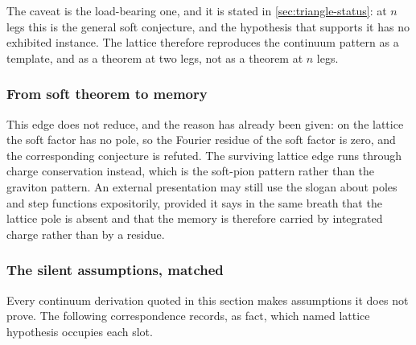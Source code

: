 The caveat is the load-bearing one, and it is stated in
\cref{sec:triangle-status}: at $n$ legs this is the general soft conjecture, and
the hypothesis that supports it has no exhibited instance. The lattice therefore
reproduces the continuum pattern as a template, and as a theorem at two legs,
not as a theorem at $n$ legs.

\subsubsection*{From soft theorem to memory}

This edge does not reduce, and the reason has already been given: on the lattice
the soft factor has no pole, so the Fourier residue of the soft factor is zero,
and the corresponding conjecture is refuted. The surviving lattice edge runs
through charge conservation instead, which is the soft-pion pattern rather than
the graviton pattern. An external presentation may still use the slogan about
poles and step functions expositorily, provided it says in the same breath that
the lattice pole is absent and that the memory is therefore carried by
integrated charge rather than by a residue.

\subsubsection*{The silent assumptions, matched}

Every continuum derivation quoted in this section makes assumptions it does not
prove. The following correspondence records, as fact, which named lattice
hypothesis occupies each slot.

